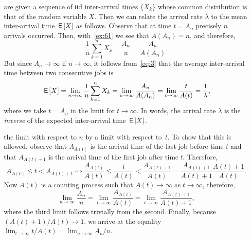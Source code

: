  are given a sequence of iid inter-arrival times  $\{X_k\}$ whose common distribution is that of the random variable $X$. Then we can relate the arrival rate $\lambda$ to the mean inter-arrival time $\,\mathsf{E}\left[X\right]$ as follows.
Observe that at time $t=A_n$ precisely $n$ arrivals occurred.
Then, with~\cref{ex:61}
we see that $A(A_n) = n$, and therefore,
\begin{equation*}
 \frac{1}n\sum_{k=1}^n X_k = \frac{A_n}n = \frac{A_n}{A(A_n)}.
\end{equation*}
But since $A_n\to\infty$ if $n\to\infty$, it follows from~\cref{eq:3} that the average inter-arrival time between two consecutive jobs is
\begin{equation}\label{eq:54}
 \,\mathsf{E}\left[X\right] = \lim_{n\to\infty} \frac{1}n\sum_{k=1}^n X_k = \lim_{n\to \infty} \frac{A_n}{A(A_n)} = \lim_{t\to\infty} \frac t{A(t)} = \frac 1 \lambda,
\end{equation}
where we take $t=A_n$ in the limit for $t\to\infty$.
In words, the arrival rate $\lambda$ is the \emph{inverse} of the expected inter-arrival time $\,\mathsf{E}\left[X\right]$.


 the limit with respect to $n$ by a limit with respect to~$t$.
To show that this is allowed, observe that $A_{A(t)}$ is the arrival time of the last job before time $t$ and that $A_{A(t)+1}$ is the arrival time of the first job after time $t$.
Therefore,
 \begin{equation*}
 A_{A(t)} \leq t < A_{A(t)+1} \Leftrightarrow
 \frac{A_{A(t)}} {A(t)} \leq \frac{t}{A(t)} <\frac{A_{A(t)+1}}{A(t)} = \frac{A_{A(t)+1}}{A(t)+1}\frac{A(t)+1}{A(t)}.
 \end{equation*}
 Now $A(t)$ is a counting process such that $A(t)\to\infty$ as $t\to\infty$, therefore,
 \begin{equation*}
\lim_{n\to\infty} \frac{A_n}{n} = \lim_{t\to\infty} \frac{A_{A(t)}}{A(t)} = \lim_{t\to\infty} \frac{A_{A(t)+1}}{A(t)+1},
 \end{equation*}
 where the third limit follows trivially from the second.
 Finally, because $(A(t)+1)/A(t)\to 1$, we arrive at the equality $\lim_{t\to\infty} t/A(t) = \lim_{n\to\infty} A_n/n$.

